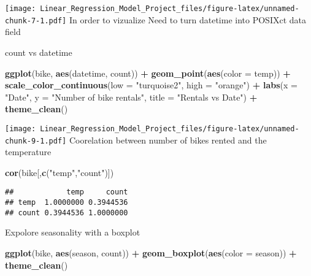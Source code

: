 \documentclass[]{article}
\newenvironment{Shaded}{\begin{snugshade}}{\end{snugshade}}
\newcommand{\KeywordTok}[1]{\textcolor[rgb]{0.13,0.29,0.53}{\textbf{#1}}}
\newcommand{\DataTypeTok}[1]{\textcolor[rgb]{0.13,0.29,0.53}{#1}}
\newcommand{\StringTok}[1]{\textcolor[rgb]{0.31,0.60,0.02}{#1}}
\newcommand{\OperatorTok}[1]{\textcolor[rgb]{0.81,0.36,0.00}{\textbf{#1}}}
\newcommand{\NormalTok}[1]{#1}
\begin{document}
\texttt{[image: Linear\_Regression\_Model\_Project\_files/figure-latex/unnamed-chunk-7-1.pdf]}
In order to vizualize Need to turn datetime into POSIXct data field

\begin{Shaded}
\end{Shaded}

count vs datetime

\begin{Shaded}
\begin{Highlighting}[]
\KeywordTok{ggplot}\NormalTok{(bike, }\KeywordTok{aes}\NormalTok{(datetime, count)) }\OperatorTok{+}
\StringTok{    }\KeywordTok{geom_point}\NormalTok{(}\KeywordTok{aes}\NormalTok{(}\DataTypeTok{color =}\NormalTok{ temp)) }\OperatorTok{+}
\StringTok{    }\KeywordTok{scale_color_continuous}\NormalTok{(}\DataTypeTok{low =} \StringTok{"turquoise2"}\NormalTok{, }\DataTypeTok{high =} \StringTok{"orange"}\NormalTok{) }\OperatorTok{+}
\StringTok{    }\KeywordTok{labs}\NormalTok{(}\DataTypeTok{x =} \StringTok{"Date"}\NormalTok{, }\DataTypeTok{y =} \StringTok{"Number of bike rentals"}\NormalTok{, }\DataTypeTok{title =} \StringTok{"Rentals vs Date"}\NormalTok{) }\OperatorTok{+}
\StringTok{    }\KeywordTok{theme_clean}\NormalTok{()}
\end{Highlighting}
\end{Shaded}

\texttt{[image: Linear\_Regression\_Model\_Project\_files/figure-latex/unnamed-chunk-9-1.pdf]}
Coorelation between number of bikes rented and the temperature

\begin{Shaded}
\begin{Highlighting}[]
\KeywordTok{cor}\NormalTok{(bike[,}\KeywordTok{c}\NormalTok{(}\StringTok{"temp"}\NormalTok{,}\StringTok{"count"}\NormalTok{)])}
\end{Highlighting}
\end{Shaded}

\begin{verbatim}
##            temp     count
## temp  1.0000000 0.3944536
## count 0.3944536 1.0000000
\end{verbatim}

Expolore seasonality with a boxplot

\begin{Shaded}
\begin{Highlighting}[]
\KeywordTok{ggplot}\NormalTok{(bike, }\KeywordTok{aes}\NormalTok{(season, count)) }\OperatorTok{+}
\StringTok{    }\KeywordTok{geom_boxplot}\NormalTok{(}\KeywordTok{aes}\NormalTok{(}\DataTypeTok{color =}\NormalTok{ season)) }\OperatorTok{+}
\StringTok{    }\KeywordTok{theme_clean}\NormalTok{()}
\end{Highlighting}
\end{Shaded}
\end{document}
